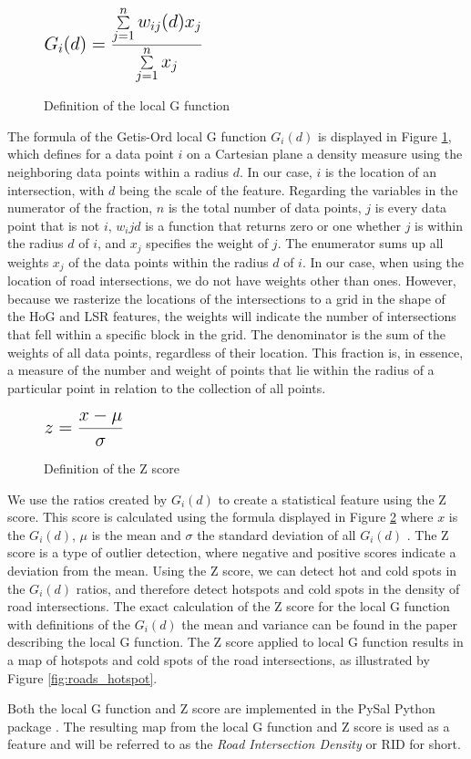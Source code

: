 \begin{figure}[h]
    \centering
    $ \mathlarger{\mathlarger{\mathlarger{  G_i(d) = \frac{\sum\limits_{j=1}^{n}w_{ij}(d)x_j}{\sum\limits_{j=1}^{n}x_j} }}} $
    \caption{Definition of the local G function}
    \label{g_function}
\end{figure}


The formula of the Getis-Ord local G function $G_i(d)$ is displayed in Figure \ref{g_function}, which defines for a data point $i$ on a Cartesian plane a density measure using the neighboring data points within a radius $d$. In our case, $i$ is the location of an intersection, with $d$ being the scale of the feature. Regarding the variables in the numerator of the fraction, $n$ is the total number of data points, $j$ is every data point that is not $i$, $w_ij{d}$ is a function that returns zero or one whether $j$ is within the radius $d$ of $i$, and $x_j$ specifies the weight of $j$. The enumerator sums up all weights $x_j$ of the data points within the radius $d$ of $i$. In our case, when using the location of road intersections, we do not have weights other than ones. However, because we rasterize the locations of the intersections to a grid in the shape of the HoG and LSR features, the weights will indicate the number of intersections that fell within a specific block in the grid. The denominator is the sum of the weights of all data points, regardless of their location. This fraction is, in essence, a measure of the number and weight of points that lie within the radius of a particular point in relation to the collection of all points.

\begin{figure}[h]
    \centering
    $ \mathlarger{\mathlarger{\mathlarger{ z = \frac{x - \mu}{\sigma} }}} $
    \caption{Definition of the Z score}
    \label{z_score}
\end{figure}

We use the ratios created by $G_i(d)$ to create a statistical feature using the Z score. This score is calculated using the formula displayed in Figure \ref{z_score} where $x$ is the $G_i(d)$, $\mu$ is the mean and $\sigma$ the standard deviation of all $G_i(d)$ \cite{kreyszig2010advanced}. The Z score is a type of outlier detection, where negative and positive scores indicate a deviation from the mean. Using the Z score, we can detect hot and cold spots in the $G_i(d)$ ratios, and therefore detect hotspots and cold spots in the density of road intersections. The exact calculation of the Z score for the local G function with definitions of the $G_i(d)$ the mean and variance can be found in the paper describing the local G function\cite{getis1992analysis}. The Z score applied to local G function results in a map of hotspots and cold spots of the road intersections, as illustrated by Figure \ref{fig:roads_hotspot}.

Both the local G function and Z score are implemented in the PySal Python package \cite{rey2010pysal}. The resulting map from the local G function and Z score is used as a feature and will be referred to as the \textit{Road Intersection Density} or RID for short.




